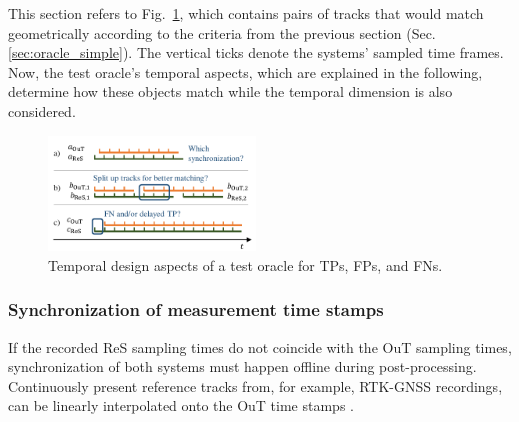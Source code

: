 \documentclass[conference]{IEEEtran}
\begin{document}

This section refers to Fig.~\ref{fig:timeline}, which contains pairs of tracks that would match geometrically according to the criteria from the previous section (Sec. \ref{sec:oracle_simple}). 
The vertical ticks denote the systems' sampled time frames.
Now, the test oracle's temporal aspects, which are explained in the following, determine how these objects match while the temporal dimension is also considered.



\begin{figure}[t]
	\centering
	\vspace*{2mm}
	\includegraphics[width=0.49\textwidth]{img/timeline.pdf}
	\caption{Temporal design aspects of a test oracle for TPs, FPs, and FNs.
	}
	\label{fig:timeline}
\end{figure}



\subsubsection{Synchronization of measurement time stamps}
\label{sec:temp_sync}

If the recorded ReS sampling times do not coincide with the OuT sampling times, synchronization of both systems must happen offline during post-processing. %
Continuously present reference tracks from, for example, RTK-GNSS recordings, can be linearly interpolated onto the OuT time stamps \cite[Sec. 10.2.7]{Brahmi2020diss}.
\end{document}
